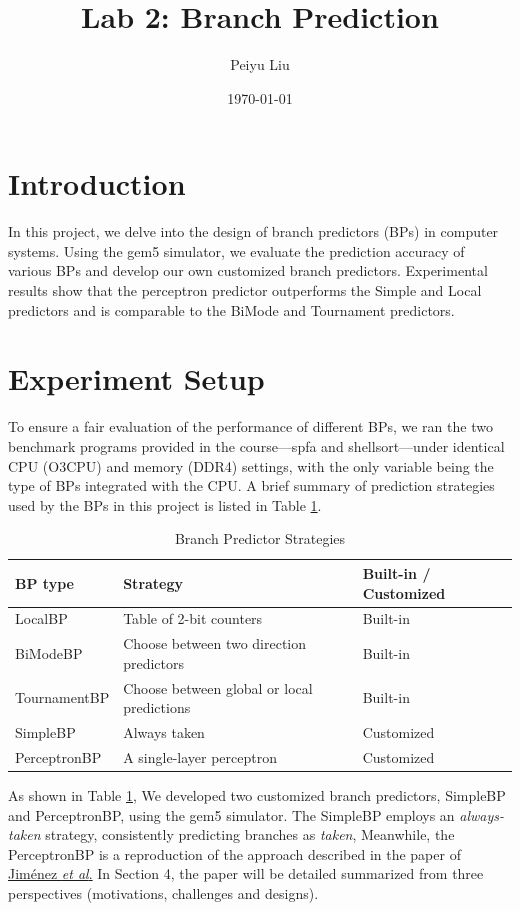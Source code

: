 \documentclass{article}
\title{Lab 2: Branch Prediction}
\author{
  Peiyu Liu
}
\date{\today}
\begin{document}
\maketitle

\section{Introduction}
In this project, we delve into the design of branch predictors (BPs) in computer systems. Using the gem5 simulator, we evaluate the prediction accuracy of various BPs and develop our own customized branch predictors. Experimental results show that the perceptron predictor outperforms the Simple and Local predictors and is comparable to the BiMode and Tournament predictors.

\section{Experiment Setup}
To ensure a fair evaluation of the performance of different BPs, we ran the two benchmark programs provided in the course—spfa and shellsort—under identical CPU (O3CPU) and memory (DDR4) settings, with the only variable being the type of BPs integrated with the CPU. A brief summary of prediction strategies used by the BPs in this project is listed in Table \ref{table1}.

\begin{table}[h!]
\centering
\renewcommand{\arraystretch}{1.5}
\begin{tabular}{|>{\centering\arraybackslash}p{4cm}|>{\centering\arraybackslash}p{6cm}|>{\centering\arraybackslash}p{4cm}|}
\hline
\textbf{BP type} & \textbf{Strategy} & \textbf{Built-in / Customized} \\ 
\hline
LocalBP & Table of 2-bit counters& Built-in \\ 
\hline
BiModeBP & Choose between two direction predictors& Built-in \\ 
\hline
TournamentBP & Choose between global or local predictions& Built-in \\ 
\hline
SimpleBP & Always taken & Customized \\ 
\hline
PerceptronBP & A single-layer perceptron & Customized \\ 
\hline
\end{tabular}
\caption{Branch Predictor Strategies}
\label{table1}
\end{table}

As shown in Table \ref{table1}, We developed two customized branch predictors, SimpleBP and PerceptronBP, using the gem5 simulator. The SimpleBP employs an \textit{always-taken} strategy, consistently predicting branches as \textit{taken}, Meanwhile, the PerceptronBP is a reproduction of the approach described in the paper of \href{https://www.cs.utexas.edu/~lin/papers/hpca01.pdf}{Jiménez \textit{et al}.} In Section 4, the paper will be detailed summarized from three perspectives (motivations, challenges and designs).
\end{document}
